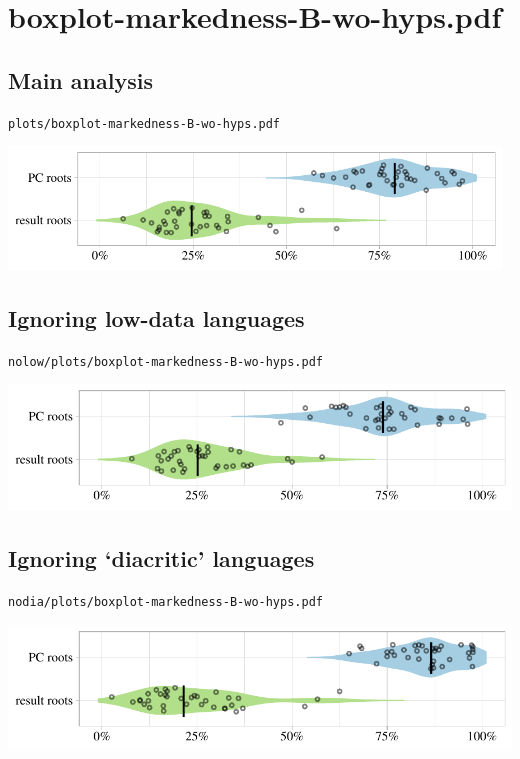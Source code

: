\eject

\section{boxplot-markedness-B-wo-hyps.pdf}

\subsection{Main analysis}

\texttt{plots/boxplot-markedness-B-wo-hyps.pdf}

\includegraphics[width=0.98\textwidth]{../plots/boxplot-markedness-B-wo-hyps.pdf}

\subsection{Ignoring low-data languages}

\texttt{nolow/plots/boxplot-markedness-B-wo-hyps.pdf}

\includegraphics[width=1.0\textwidth]{../nolow/plots/boxplot-markedness-B-wo-hyps.pdf}

\subsection{Ignoring `diacritic' languages}

\texttt{nodia/plots/boxplot-markedness-B-wo-hyps.pdf}

\includegraphics[width=1.0\textwidth]{../nodia/plots/boxplot-markedness-B-wo-hyps.pdf}

